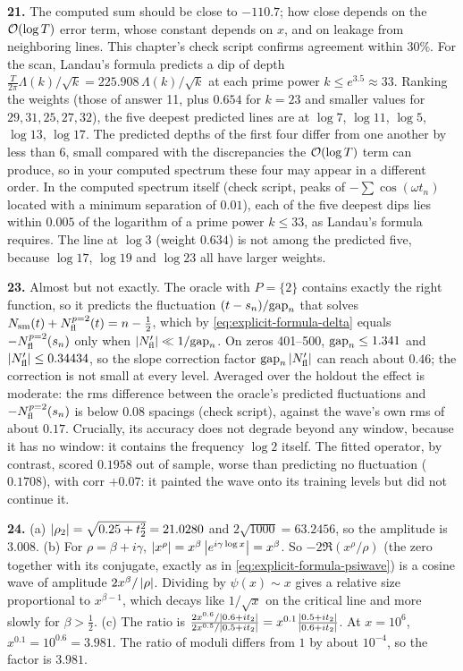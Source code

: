 \textbf{21.} The computed sum should be close to $-110.7$; how close depends on the $\mathcal{O}(\log T)$ error term, whose constant depends on $x$, and on leakage from neighboring lines. This chapter's check script confirms agreement within $30\%$. For the scan, Landau's formula predicts a dip of depth $\frac{T}{2\pi}\Lambda(k)/\sqrt k=225.908\,\Lambda(k)/\sqrt k$ at each prime power $k\le e^{3.5}\approx33$. Ranking the weights (those of answer 11, plus $0.654$ for $k=23$ and smaller values for $29,31,25,27,32$), the five deepest predicted lines are at $\log7$, $\log11$, $\log5$, $\log13$, $\log17$. The predicted depths of the first four differ from one another by less than $6$, small compared with the discrepancies the $\mathcal{O}(\log T)$ term can produce, so in your computed spectrum these four may appear in a different order. In the computed spectrum itself (check script, peaks of $-\sum\cos(\omega t_n)$ located with a minimum separation of $0.01$), each of the five deepest dips lies within $0.005$ of the logarithm of a prime power $k\le33$, as Landau's formula requires. The line at $\log3$ (weight $0.634$) is not among the predicted five, because $\log17$, $\log19$ and $\log23$ all have larger weights.

\textbf{23.} Almost but not exactly. The oracle with $P=\{2\}$ contains exactly the right function, so it predicts the fluctuation $(t-s_n)/\mathrm{gap}_n$ that solves $N_{\mathrm{sm}}(t)+N^{p=2}_{\rm fl}(t)=n-\frac12$, which by \cref{eq:explicit-formula-delta} equals $-N^{p=2}_{\rm fl}(s_n)$ only when $\left\lvert N_{\mathrm{fl}}'\right\rvert\ll1/\mathrm{gap}_n$. On zeros 401--500, $\mathrm{gap}_n\le1.341$ and $\left\lvert N_{\mathrm{fl}}'\right\rvert\le0.34434$, so the slope correction factor $\mathrm{gap}_n\left\lvert N_{\mathrm{fl}}'\right\rvert$ can reach about $0.46$; the correction is not small at every level. Averaged over the holdout the effect is moderate: the rms difference between the oracle's predicted fluctuations and $-N^{p=2}_{\rm fl}(s_n)$ is below $0.08$ spacings (check script), against the wave's own rms of about $0.17$. Crucially, its accuracy does not degrade beyond any window, because it has no window: it contains the frequency $\log2$ itself. The fitted operator, by contrast, scored $0.1958$ out of sample, worse than predicting no fluctuation ($0.1708$), with corr $+0.07$: it painted the wave onto its training levels but did not continue it.

\textbf{24.} (a) $\left\lvert \rho_2\right\rvert=\sqrt{0.25+t_2^2}=21.0280$ and $2\sqrt{1000}=63.2456$, so the amplitude is $3.008$. (b) For $\rho=\beta+i\gamma$, $\left\lvert x^{\rho}\right\rvert=x^{\beta}\left\lvert e^{i\gamma\log x}\right\rvert=x^{\beta}$. So $-2\Re(x^\rho/\rho)$ (the zero together with its conjugate, exactly as in \cref{eq:explicit-formula-psiwave}) is a cosine wave of amplitude $2x^{\beta}/\left\lvert \rho\right\rvert$. Dividing by $\psi(x)\sim x$ gives a relative size proportional to $x^{\beta-1}$, which decays like $1/\sqrt x$ on the critical line and more slowly for $\beta>\tfrac12$. (c) The ratio is $\frac{2x^{0.6}/\left\lvert 0.6+it_2\right\rvert}{2x^{0.5}/\left\lvert 0.5+it_2\right\rvert}=x^{0.1}\frac{\left\lvert 0.5+it_2\right\rvert}{\left\lvert 0.6+it_2\right\rvert}$. At $x=10^6$, $x^{0.1}=10^{0.6}=3.981$. The ratio of moduli differs from $1$ by about $10^{-4}$, so the factor is $3.981$.

